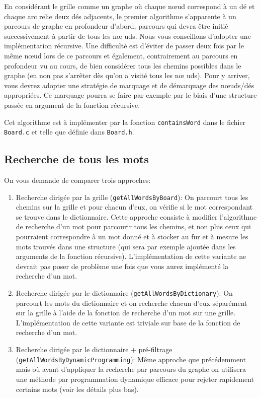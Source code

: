 \documentclass[a4paper,10pt]{article}
\begin{document}
En considérant le grille comme un graphe où chaque n\oe ud correspond
à un dé et chaque arc relie deux dés adjacents, le premier algorithme
s'apparente à un parcours de graphe en profondeur d'abord, parcours
qui devra être initié successivement à partir de tous les n\oe
uds. Nous vous conseillons d'adopter une implémentation récursive. Une
difficulté est d'éviter de passer deux fois par le même n\oe ud lors
de ce parcours et également, contrairement au parcours en profondeur
vu au cours, de bien considérer tous les chemins possibles dans le
graphe (en non pas s'arrêter dès qu'on a visité tous les n\oe
uds). Pour y arriver, vous devrez adopter une stratégie de marquage et
de démarquage des n\oe uds/dés appropriées. Ce marquage pourra se
faire par exemple par le biais d'une structure passée en argument de
la fonction récursive.

Cet algorithme est à implémenter par la fonction \texttt{containsWord}
dans le fichier \texttt{Board.c} et telle que définie dans \texttt{Board.h}.

\subsection{Recherche de tous les mots}\label{sec:rechmot}

On vous demande de comparer trois approches:
\begin{enumerate}
\item Recherche dirigée par la grille (\texttt{getAllWordsByBoard}):
  On parcourt tous les chemins sur la grille et pour chacun d'eux, on
  vérifie si le mot correspondant se trouve dans le
  dictionnaire. Cette approche consiste à modifier l'algorithme de
  recherche d'un mot pour parcourir tous les chemins, et non plus ceux
  qui pourraient correspondre à un mot donné et à stocker au fur et à
  mesure les mots trouvés dans une structure (qui sera par exemple
  ajoutée dans les arguments de la fonction
  récursive). L'implémentation de cette variante ne devrait pas poser
  de problème une fois que vous aurez implémenté la recherche d'un
  mot.
\item Recherche dirigée par le dictionnaire
  (\texttt{getAllWordsByDictionary}): On parcourt les mots du
  dictionnaire et on recherche chacun d'eux séparément sur la grille à
  l'aide de la fonction de recherche d'un mot sur une
  grille. L'implémentation de cette variante est triviale sur base de
  la fonction de recherche d'un mot.
\item Recherche dirigée par le dictionnaire + pré-filtrage
  (\texttt{getAllWordsByDynamicProgramming}): Même approche que
  précédemment mais où avant d'appliquer la recherche par parcours du
  graphe on utilisera une méthode par programmation dynamique efficace
  pour rejeter rapidement certains mots (voir les détails plus bas).
\end{enumerate}
\end{document}
